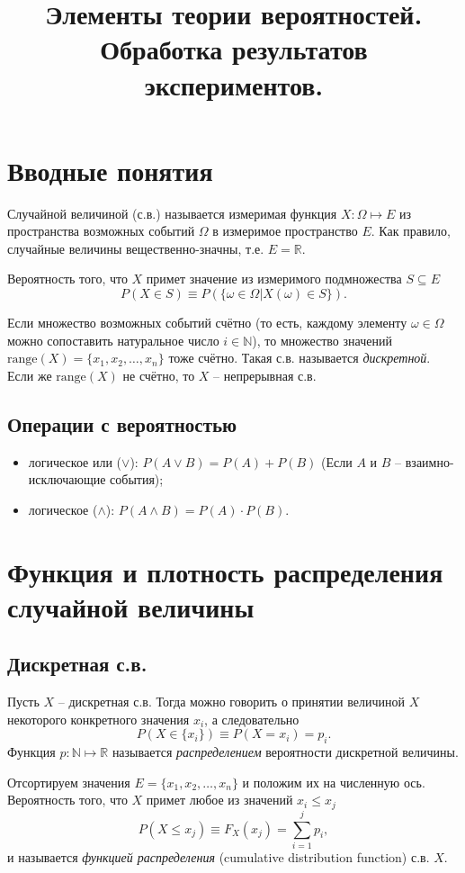 \documentclass{report}
\title{Элементы теории вероятностей. Обработка результатов экспериментов.}
\newcommand{\rng}{\mathrm{range}}
\begin{document}
	\maketitle
	
\section{Вводные понятия}
Случайной величиной (с.в.) называется измеримая функция $X:\Omega\mapsto E$  из пространства возможных событий $\Omega$ в измеримое пространство $E$. Как правило, случайные величины вещественно-значны, т.е. $E=\mathbb{R}$.

Вероятность того, что $X$ примет значение из измеримого подмножества $S\subseteq E$
\[
P(X\in S) \equiv P(\{\omega\in\Omega| X(\omega)\in S\}).
\]
	
Если множество возможных событий счётно (то есть, каждому элементу $\omega\in\Omega$ можно сопоставить натуральное число $i\in\mathbb{N}$), то множество значений $\rng(X) = \{x_1, x_2, \dots, x_n\}$ тоже счётно. Такая с.в. называется \emph{дискретной}. Если же $\rng(X)$ не счётно, то $X$ -- непрерывная с.в.

\subsection{Операции с вероятностью}
\begin{itemize}
	\item логическое или ($\vee$): $P(A \vee B)  = P(A) + P(B)$ (Если $A$ и $B$ -- взаимно-исключающие события);
	\item логическое ($\wedge$): $P(A\wedge B) = P(A)\cdot P(B)$.
\end{itemize}
	
\section{Функция и плотность распределения случайной величины}
\subsection{Дискретная с.в.}

Пусть $X$ -- дискретная с.в. Тогда можно говорить о принятии величиной $X$ некоторого конкретного значения $x_i$, а следовательно 
\[
P(X\in\{x_i\}) \equiv P(X=x_i) = p_i.
\]
Функция $p: \mathbb{N}\mapsto\mathbb{R}$ называется \emph{распределением} вероятности дискретной величины.

Отсортируем значения $E = \{x_1, x_2,\dots, x_n\}$ и положим их на численную ось. Вероятность того, что $X$ примет любое из значений $x_i \leq x_j$ 
\[
P(X \leq x_j) \equiv F_X(x_j) = \sum_{i=1}^j p_i,
\]
и называется \emph{функцией распределения} (cumulative distribution function) с.в.  $X$.
\end{document}
